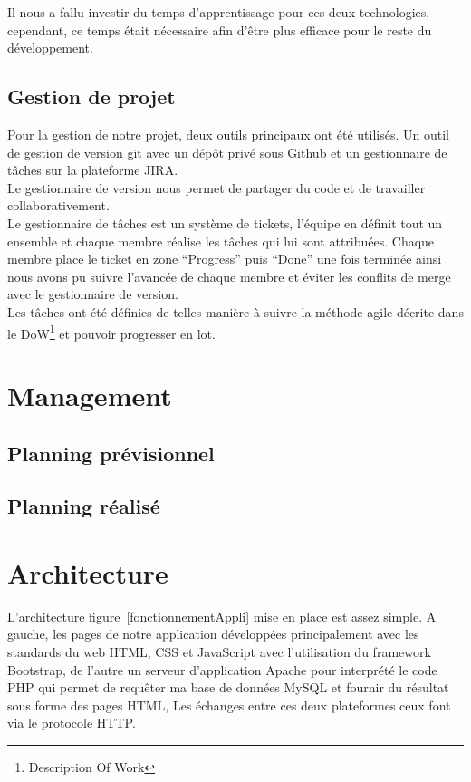 \documentclass{sigplanconf}
\begin{document}
Il nous a fallu investir du temps d'apprentissage pour ces deux technologies, cependant, ce temps était nécessaire afin d'être plus efficace pour le reste du développement.

\subsection{Gestion de projet}
Pour la gestion de notre projet, deux outils principaux ont été utilisés. Un outil de gestion de version git avec un dépôt privé sous Github et un gestionnaire de tâches sur la plateforme JIRA.\\
Le gestionnaire de version nous permet de partager du code et de travailler collaborativement.\\
Le gestionnaire de tâches est un système de tickets, l’équipe en définit tout un ensemble et chaque membre réalise les tâches qui lui sont attribuées. Chaque membre place le ticket en zone “Progress” puis “Done” une fois terminée ainsi nous avons pu suivre l’avancée de chaque membre et éviter les conflits de merge avec le gestionnaire de version.\\
Les tâches ont été définies de telles manière à suivre la méthode agile décrite dans le DoW\footnote{Description Of Work} et pouvoir progresser en lot.

\section{Management}
\subsection{Planning prévisionnel}
\subsection{Planning réalisé}
\section{Architecture}
L'architecture figure~\ref{fonctionnementAppli} mise en place est assez simple. A gauche, les pages de notre application développées principalement avec les standards du web HTML, CSS et JavaScript avec l’utilisation du framework Bootstrap,  de l'autre un serveur d'application Apache pour interprété le code PHP qui permet de requêter ma base de données MySQL et fournir du résultat sous forme des pages HTML, Les échanges entre ces deux plateformes ceux font via le protocole HTTP.
\end{document}
